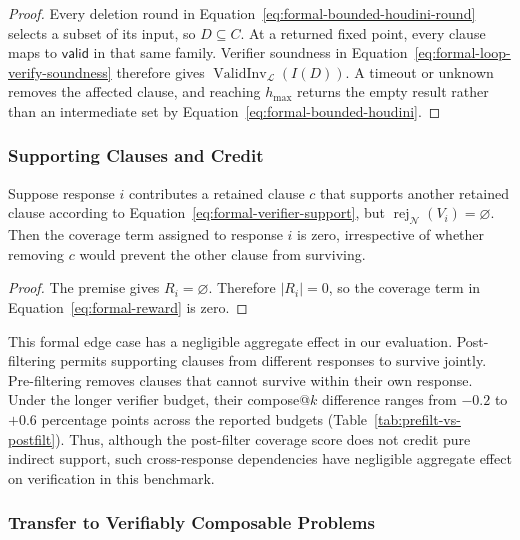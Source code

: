 \begin{proof}
Every deletion round in Equation~\eqref{eq:formal-bounded-houdini-round}
selects a subset of its input, so \(D\subseteq C\).  At a returned fixed point,
every clause maps to \(\mathsf{valid}\) in that same family.  Verifier
soundness in Equation~\eqref{eq:formal-loop-verify-soundness} therefore gives
\(\operatorname{ValidInv}_{\mathcal L}(I(D))\).  A timeout or unknown removes the
affected clause, and reaching \(h_{\max}\) returns the empty result rather
than an intermediate set by Equation~\eqref{eq:formal-bounded-houdini}.
\end{proof}

\subsubsection{Supporting Clauses and Credit}

\begin{proposition}
\label{prop:support-credit}
Suppose response \(i\) contributes a retained clause \(c\) that supports
another retained clause according to
Equation~\eqref{eq:formal-verifier-support}, but
\(\operatorname{rej}_{\mathcal N}(V_i)=\varnothing\).  Then the coverage
term assigned to response \(i\) is zero, irrespective of whether removing
\(c\) would prevent the other clause from surviving.
\end{proposition}

\begin{proof}
The premise gives \(R_i=\varnothing\).  Therefore \(|R_i|=0\), so the
coverage term in Equation~\eqref{eq:formal-reward} is zero.
\end{proof}

This formal edge case has a negligible aggregate effect in our evaluation.
Post-filtering permits supporting clauses from different responses to survive
jointly. Pre-filtering removes clauses that cannot survive within their own
response. Under the longer verifier budget, their compose@\(k\)
difference ranges from \(-0.2\) to \(+0.6\) percentage points across the
reported budgets (Table~\ref{tab:prefilt-vs-postfilt}).  Thus, although the
post-filter coverage score does not credit pure indirect support, such
cross-response dependencies have negligible aggregate effect on verification
in this benchmark.

\subsubsection{Transfer to Verifiably Composable Problems}

